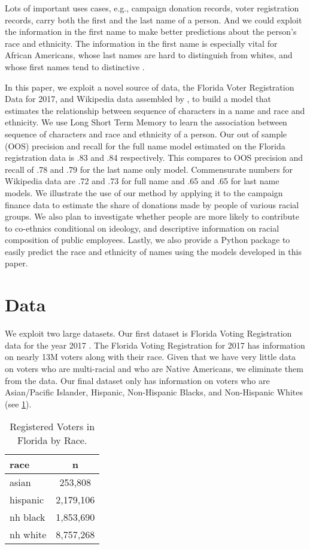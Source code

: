 \documentclass[12pt, letterpaper]{article}
\begin{document}
Lots of important uses cases, e.g., campaign donation records, voter registration records, carry both the first and the last name of a person. And we could exploit the information in the first name to make better predictions about the person's race and ethnicity. The information in the first name is especially vital for African Americans, whose last names are hard to distinguish from whites, and whose first names tend to distinctive \citep{bertrand2004emily}. 

In this paper, we exploit a novel source of data, the Florida Voter Registration Data for 2017, and Wikipedia data assembled by \citet{ambekar2009name}, to build a model that estimates the relationship between sequence of characters in a name and race and ethnicity. We use Long Short Term Memory to learn the association between sequence of characters and race and ethnicity of a person. Our out of sample (OOS) precision and recall for the full name model estimated on the Florida registration data is .83 and .84 respectively. This compares to OOS precision and recall of .78 and .79 for the last name only model. Commensurate numbers for Wikipedia data are .72 and .73 for full name and .65 and .65 for last name models. We illustrate the use of our method by applying it to the campaign finance data to estimate the share of donations made by people of various racial groups. We also plan to investigate whether people are more likely to contribute to co-ethnics conditional on ideology, and descriptive information on racial composition of public employees. Lastly, we also provide a Python package to easily predict the race and ethnicity of names using the models developed in this paper.

\section*{Data}
We exploit two large datasets. Our first dataset is Florida Voting Registration data for the year 2017 \citep{sood_2017}. The Florida Voting Registration for 2017 has information on nearly 13M voters along with their race. Given that we have very little data on voters who are multi-racial and who are Native Americans, we eliminate them from the data. Our final dataset only has information on voters who are Asian/Pacific Islander, Hispanic, Non-Hispanic Blacks, and Non-Hispanic Whites (see \ref{table:fl_data}). 

\begin{table}[h!]
\centering
\caption{Registered Voters in Florida by Race.}
\begin{tabular}{ l c }
\hline	
race & n \\
\hline
asian & 253,808 \\
hispanic & 2,179,106 \\
nh black & 1,853,690 \\
nh white & 8,757,268 \\
\hline
\end{tabular}
\label{table:fl_data}
\end{table}
\end{document}

